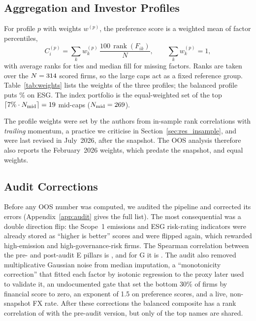 \subsection{Aggregation and Investor Profiles}
\label{sec:aggregation}

For profile $p$ with weights $w^{(p)}$, the preference score is a weighted
mean of factor percentiles,
\begin{equation}
C^{(p)}_i=\sum_k w^{(p)}_k\,\frac{100\,\operatorname{rank}(F_{ik})}{N},
\qquad \sum_k w^{(p)}_k=1,
\label{eq:composite}
\end{equation}
with average ranks for ties and median fill for missing factors. Ranks are
taken over the $N=314$ scored firms, so the \NLarge large caps act as a
fixed reference group. Table~\ref{tab:weights} lists the weights of the three
profiles; the balanced profile puts \WBalESG\% on ESG. The index portfolio is
the equal-weighted set of the top
$\lceil 7\%\cdot N_{\mathrm{mid}}\rceil=19$ mid-caps
($N_{\mathrm{mid}}=269$).

The profile weights were set by the authors from in-sample rank correlations
with \emph{trailing} momentum, a practice we criticise in
Section~\ref{sec:res_insample}, and were last revised in July~2026, after the
snapshot. The OOS analysis therefore also reports the February~2026 weights,
which predate the snapshot, and equal weights.

\begin{table}[t]
\centering
\caption{Effective profile weights (\%) after removing the market factor.}
\label{tab:weights}
\small

\end{table}

\subsection{Audit Corrections}
\label{sec:audit}

Before any OOS number was computed, we audited the pipeline and corrected
its errors (Appendix~\ref{app:audit} gives the full list). The most
consequential was a double direction flip: the Scope~1 emissions and ESG
risk-rating indicators were already stored as ``higher is better'' scores
and were flipped again, which rewarded high-emission and high-governance-risk
firms. The Spearman correlation between the pre- and post-audit E pillars is
\RhoPrePostE, and for G it is \RhoPrePostG. The audit also removed
multiplicative Gaussian noise from median imputation, a ``monotonicity
correction'' that fitted each factor by isotonic regression to the proxy
later used to validate it, an undocumented gate that set the bottom 30\% of
firms by financial score to zero, an exponent of 1.5 on preference scores,
and a live, non-snapshot FX rate. After these corrections the balanced
composite has a rank correlation of \RhoPrePostBal with the pre-audit
version, but only \OverlapPrePost of the \TopN top names are shared.

